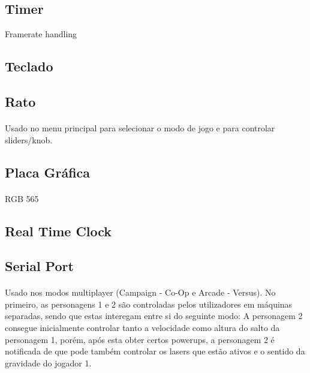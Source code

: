 \documentclass{report}
\begin{document}
\subsection{Timer}

Framerate handling

\subsection{Teclado}

\subsection{Rato}

\paragraph{}
Usado no menu principal para selecionar o modo de jogo e para controlar sliders/knob.

\subsection{Placa Gráfica}

\paragraph{}
RGB 565

\subsection{Real Time Clock}

\subsection{Serial Port}

\paragraph{}
Usado nos modos multiplayer (Campaign - Co-Op e Arcade - Versus). No primeiro, as personagens 1 e 2 são controladas pelos utilizadores em máquinas separadas, sendo que estas interegam entre si do seguinte modo: A personagem 2 consegue inicialmente controlar tanto a velocidade como altura do salto da personagem 1,
porém, após esta obter certos powerups, a personagem 2 é notificada de que pode também controlar os lasers que estão ativos e o sentido da gravidade do jogador 1.
\end{document}
